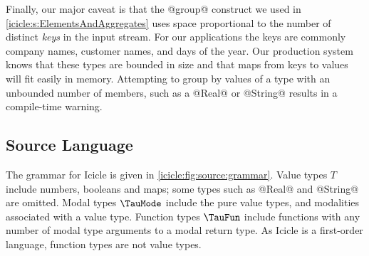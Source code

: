Finally, our major caveat is that the @group@ construct we used in \cref{icicle:s:ElementsAndAggregates} uses space proportional to the number of distinct \emph{keys} in the input stream.
For our applications the keys are commonly company names, customer names, and days of the year.
Our production system knows that these types are bounded in size and that maps from keys to values will fit easily in memory.
Attempting to group by values of a type with an unbounded number of members, such as a @Real@ or @String@ results in a compile-time warning.




\subsection{Source Language}
\label{icicle:s:IcicleSource}

The grammar for Icicle is given in \cref{icicle:fig:source:grammar}.
Value types $T$ include numbers, booleans and maps; some types such as @Real@ and @String@ are omitted.
Modal types $\TauMode$ include the pure value types, and modalities associated with a value type.
Function types $\TauFun$ include functions with any number of modal type arguments to a modal return type.
As Icicle is a first-order language, function types are not value types.


